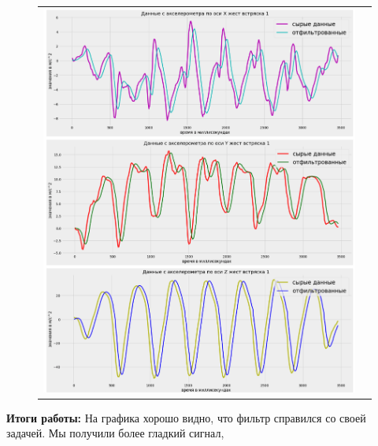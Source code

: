 \begin{figure}[H]
    \begin{center}
        \begin{tabular}{cc}
            \includegraphics[width=1\textwidth]{farim/shak.png} & 
        \end{tabular}
    \end{center}
\end{figure}


\textbf{Итоги работы:} На графика хорошо видно, 
что фильтр справился со своей задачей. Мы получили более гладкий сигнал,
